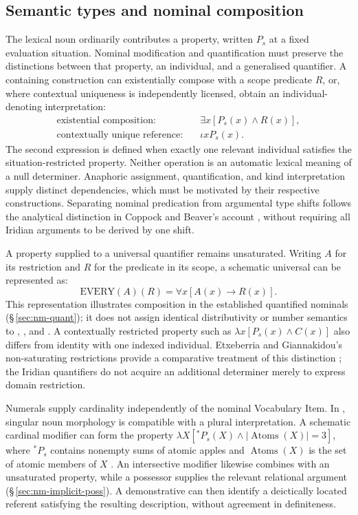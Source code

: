 \subsection{Semantic types and nominal composition}
\label{sec:nm-semantic-types}

The lexical noun ordinarily contributes a property, written \(P_s\) at a
fixed evaluation situation. Nominal modification and quantification must
preserve the distinctions between that property, an individual, and a
generalised quantifier. A containing construction can existentially compose
with a scope predicate \(R\), or, where contextual uniqueness is independently
licensed, obtain an individual-denoting interpretation:
\[
\begin{aligned}
  \text{existential composition:}\quad
    &\exists x[P_s(x)\land R(x)],\\
  \text{contextually unique reference:}\quad
    &\iota x P_s(x).
\end{aligned}
\]
The second expression is defined when exactly one relevant individual
satisfies the situation-restricted property. Neither operation is an
automatic lexical meaning of a null determiner. Anaphoric assignment,
quantification, and kind interpretation supply distinct dependencies, which
must be motivated by their respective constructions. Separating nominal
predication from argumental type shifts follows the analytical distinction
in Coppock and Beaver's account \cite[§\,1]{coppockbeaver2015}, without
requiring all Iridian arguments to be derived by one shift.

A property supplied to a universal quantifier remains unsaturated. Writing
\(A\) for its restriction and \(R\) for the predicate in its scope, a
schematic universal can be represented as:
\[
 \mathrm{EVERY}(A)(R)=\forall x[A(x)\mathbin{\rightarrow}R(x)].
\]
This representation illustrates composition in the established quantified
nominals (§\,\ref{sec:nm-quant}); it does not assign identical
distributivity or number semantics to , , and
. A contextually restricted property such as
\(\lambda x[P_s(x)\land C(x)]\) also differs from identity with one
indexed individual. Etxeberria and Giannakidou's non-saturating restrictions
provide a comparative treatment of this distinction
\cite[§§\,2.1, 3]{etxeberriagiannakidou2019}; the Iridian quantifiers do
not acquire an additional determiner merely to express domain restriction.

Numerals supply cardinality independently of the nominal Vocabulary Item.
In  , singular noun morphology is
compatible with a plural interpretation. A schematic cardinal modifier can
form the property
\(\lambda X[{}^{*}P_s(X)\land |\operatorname{Atoms}(X)|=3]\), where
\({}^{*}P_s\) contains nonempty sums of atomic apples and
\(\operatorname{Atoms}(X)\) is the set of atomic members of \(X\)
\cite[pp.\,15, 24--25]{marti2020}. An intersective modifier likewise
combines with an unsaturated property, while a possessor supplies the
relevant relational argument (§\,\ref{sec:nm-implicit-poss}). A
demonstrative can then identify a deictically located referent satisfying the
resulting description, without agreement in definiteness.

